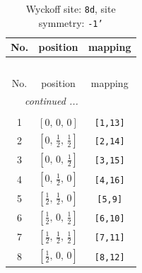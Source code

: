 \documentclass[fleqn,8pt]{jsarticle}
\begin{document}
\begin{longtable}{ccc}
\caption{Wyckoff site: {\tt 8d}, site symmetry: {\tt -1'}}
 \\
 \hline \hline
No. & position & mapping \\ \hline \endfirsthead

\multicolumn{2}{l}{\tablename\ \thetable{}} \\
 \hline \hline
No. & position & mapping \\ \hline \endhead

 \hline \hline
\multicolumn{2}{r}{\footnotesize\it continued ...} \\ \endfoot

 \hline \hline
\multicolumn{2}{r}{} \\ \endlastfoot

1 & $\left[ 0,\, 0,\, 0 \right]$ & {\tt [1,13]} \\ \hline
2 & $\left[ 0,\, \frac{1}{2},\, \frac{1}{2} \right]$ & {\tt [2,14]} \\ \hline
3 & $\left[ 0,\, 0,\, \frac{1}{2} \right]$ & {\tt [3,15]} \\ \hline
4 & $\left[ 0,\, \frac{1}{2},\, 0 \right]$ & {\tt [4,16]} \\ \hline
5 & $\left[ \frac{1}{2},\, \frac{1}{2},\, 0 \right]$ & {\tt [5,9]} \\ \hline
6 & $\left[ \frac{1}{2},\, 0,\, \frac{1}{2} \right]$ & {\tt [6,10]} \\ \hline
7 & $\left[ \frac{1}{2},\, \frac{1}{2},\, \frac{1}{2} \right]$ & {\tt [7,11]} \\ \hline
8 & $\left[ \frac{1}{2},\, 0,\, 0 \right]$ & {\tt [8,12]} \\
\end{longtable}
\renewcommand{\arraystretch}{1.2}
\end{document}
